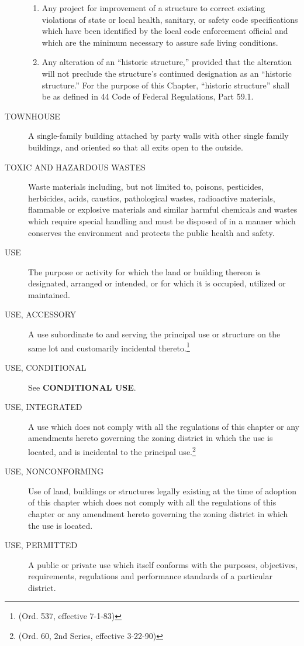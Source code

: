 \begin{description}
        \begin{enumerate}[{\indent}a)]
            \item Any project for improvement of a structure to correct existing violations of state or local health, sanitary, or safety code specifications which have been identified by the local code enforcement official and which are the minimum necessary to assure safe living conditions.
            \item Any alteration of an “historic structure,” provided that the alteration will not preclude the structure’s continued designation as an “historic structure.” For the purpose of this Chapter, “historic structure” shall be as defined in 44 Code of Federal Regulations, Part 59.1.
        \end{enumerate}
    \item[TOWNHOUSE] A single-family building attached by party walls with other single family buildings, and oriented so that all exits open to the outside.
    \item[TOXIC AND HAZARDOUS WASTES] Waste materials including, but not limited to, poisons, pesticides, herbicides, acids, caustics, pathological wastes, radioactive materials, flammable or explosive materials and similar harmful chemicals and wastes which require special handling and must be disposed of in a manner which conserves the environment and protects the public health and safety.
    \item[USE] The purpose or activity for which the land or building thereon is designated, arranged or intended, or for which it is occupied, utilized or maintained.
    \item[USE, ACCESSORY] A use subordinate to and serving the principal use or structure on the same lot and customarily incidental thereto.\footnote{(Ord. 537, effective 7-1-83)}
    \item[USE, CONDITIONAL] See \textbf{CONDITIONAL USE}.
    \item[USE, INTEGRATED] A use which does not comply with all the regulations of this chapter or any amendments hereto governing the zoning district in which the use is located, and is incidental to the principal use.\footnote{(Ord. 60, 2nd Series, effective 3-22-90)}
    \item[USE, NONCONFORMING] Use of land, buildings or structures legally existing at the time of adoption of this chapter which does not comply with all the regulations of this chapter or any amendment hereto governing the zoning district in which the use is located.
    \item[USE, PERMITTED] A public or private use which itself conforms with the purposes, objectives, requirements, regulations and performance standards of a particular district.

\end{description}
